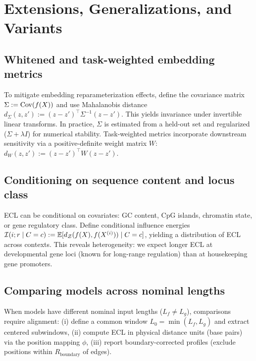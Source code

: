 \section{Extensions, Generalizations, and Variants}\label{sec:extensions}

\subsection{Whitened and task-weighted embedding metrics}

To mitigate embedding reparameterization effects, define the covariance matrix $\Sigma := \operatorname{Cov}(f(X))$ and use Mahalanobis distance $d_\Sigma(z,z') := (z-z')^\top \Sigma^{-1}(z-z')$. This yields invariance under invertible linear transforms. In practice, $\Sigma$ is estimated from a held-out set and regularized ($\Sigma + \lambda I$) for numerical stability. Task-weighted metrics incorporate downstream sensitivity via a positive-definite weight matrix $W$: $d_W(z,z') := (z-z')^\top W(z-z')$.

\subsection{Conditioning on sequence content and locus class}

ECL can be conditional on covariates: GC content, CpG islands, chromatin state, or gene regulatory class. Define conditional influence energies
$\mathcal{I}(i;r\mid C=c) := \mathbb{E}[d_{\mathcal{Z}}(f(X),f(X^{(i)})) \mid C=c]$,
yielding a distribution of ECL across contexts. This reveals heterogeneity: we expect longer ECL at developmental gene loci (known for long-range regulation) than at housekeeping gene promoters.

\subsection{Comparing models across nominal lengths}

When models have different nominal input lengths ($L_f \neq L_g$), comparisons require alignment:
(i) define a common window $L_0 = \min(L_f, L_g)$ and extract centered subwindows,
(ii) compute ECL in physical distance units (base pairs) via the position mapping $\phi$,
(iii) report boundary-corrected profiles (exclude positions within $R_{\mathrm{boundary}}$ of edges).


